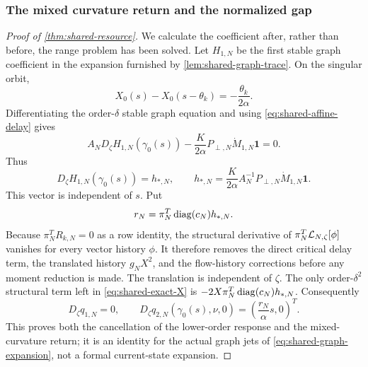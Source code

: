 \subsubsection{The mixed curvature return and the normalized gap}

\begin{proof}[Proof of \cref{thm:shared-resource}]
We calculate the coefficient after, rather than before, the range problem
has been solved.  Let \(H_{1,N}\) be the first stable graph coefficient in
the expansion furnished by \cref{lem:shared-graph-trace}.  On the singular
orbit,
\begin{equation}
 X_0(s)-X_0(s-\theta_k)=-\frac{\theta_k}{2\alpha}.
                                                               \label{eq:shared-affine-delay}
\end{equation}
Differentiating the order-\(\delta\) stable graph equation and using
\cref{eq:shared-affine-delay} gives
\[
 A_ND_\zeta H_{1,N}(\gamma_0(s))
 -\frac{K}{2\alpha}P_{\perp,N}\dot M_{1,N}\mathbf1=0.
\]
Thus
\begin{equation}
 D_\zeta H_{1,N}(\gamma_0(s))=h_{*,N},\qquad
 h_{*,N}=\frac{K}{2\alpha}A_N^{-1}P_{\perp,N}
             \dot M_{1,N}\mathbf1.                  \label{eq:hstar-rn-a}
\end{equation}
This vector is independent of \(s\).  Put
\begin{equation}
 r_N=\pi_N^T\operatorname{diag}(c_N)h_{*,N}.                         \label{eq:hstar-rn}
\end{equation}
Because \(\pi_N^TR_{k,N}=0\) as a row identity, the structural derivative
of \(\pi_N^T\mathcal L_{N,\zeta}[\phi]\) vanishes for every vector history
\(\phi\).  It therefore removes the direct critical delay term, the
translated history \(g_NX^2\), and the flow-history corrections before any
moment reduction is made.  The translation is independent of \(\zeta\).
The only order-\(\delta^2\) structural term left in
\cref{eq:shared-exact-X} is
\(-2X\pi_N^T\operatorname{diag}(c_N)h_{*,N}\).  Consequently
\begin{equation}
 D_\zeta q_{1,N}=0,\qquad
 D_\zeta q_{2,N}(\gamma_0(s),\nu,0)
   =\left(\frac{r_N}{\alpha}s,0\right)^T.              \label{eq:q2-return}
\end{equation}
This proves both the cancellation of the lower-order response and the
mixed-curvature return; it is an identity for the actual graph jets of
\cref{eq:shared-graph-expansion}, not a formal current-state expansion.


\end{proof}
